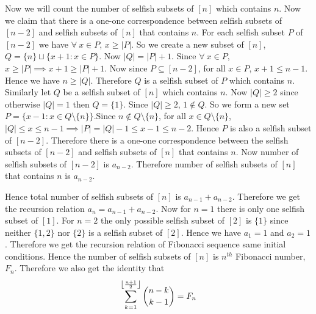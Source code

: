\documentclass[a4paper, 11pt]{article}
\begin{document}
{\begin{enumerate}[label=(\alph*)]
	Now we will count the number of selfish subsets of $[n]$ which  contains $n$. Now we claim that there is a one-one correspondence between selfish subsets of $[n-2]$ and selfish subsets of $[n]$ that contains $n$. For each selfish subset $P$ of $[n-2]$ we have $\forall\ x\in P$, $x\geq |P|$. So we create a new subset of $[n]$, $Q=\{n\}\sqcup\{x+1\colon x\in P\}$. Now $|Q|=|P|+1$. Since $\forall\ x\in P$, $x\geq |P|\implies x+1\geq |P|+1$. Now since $P\subseteq [n-2]$, for all $x\in P$, $x+1\leq n-1$. Hence we have $n\geq |Q|$. Therefore $Q$ is a selfish subset of $P$ which contains $n$.  Similarly let $Q$ be a selfish subset of $[n]$ which contains $n$. Now $|Q|\geq 2$ since otherwise $|Q|=1$ then $Q=\{1\}$. Since $|Q|\geq 2$, $1\notin Q$. So we form a new set $P=\{x-1\colon x\in Q\setminus\{n\}\}$.Since $n\notin Q\setminus \{n\}$, for all $x\in Q\setminus \{n\}$, $|Q|\leq x\leq n-1\implies |P|=|Q|-1\leq x-1\leq n-2$. Hence $P$ is also a selfish subset of $[n-2]$. Therefore there is a one-one correspondence between the selfish subsets of $[n-2]$ and selfish subsets of $[n]$ that contains $n$. Now number of selfish subsets of $[n-2]$ is $a_{n-2}$. Therefore number of selfish subsets of $[n]$ that contains $n$ is $a_{n-2}$. 
	
	Hence total number of selfish subsets of $[n]$ is $a_{n-1}+a_{n-2}$. Therefore we get the recursion relation $a_n=a_{n-1}+a_{n-2}$. Now for $n=1$ there is only one selfish subset of $[1]$. For $n=2$ the only possible selfish subset of $[2] $ is $\{1\}$ since neither $\{1,2\}$ nor $\{2\}$ is a selfish subset of $[2]$. Hence we have $a_1=1$ and $a_2=1$. Therefore we get the recursion relation of Fibonacci sequence same initial conditions. Hence the number of selfish subsets of $[n]$ is $n^{th}$ Fibonacci number, $F_n$. Therefore we also get the identity that$$ \sum_{k=1}^{\left\lfloor\frac{n+1}2\right\rfloor}\binom{n-k}{k-1}=F_n$$
\end{enumerate}
}

\end{document}
